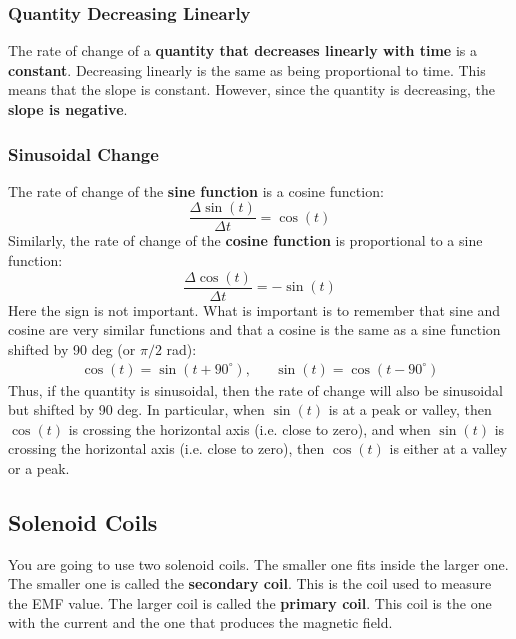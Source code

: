 \subsubsection{Quantity Decreasing Linearly}
The rate of change of a \textbf{quantity that decreases linearly with time} is a \textbf{constant}. Decreasing linearly is the same as being proportional to time. This means that the slope is constant. However, since the quantity is decreasing, the \textbf{slope is negative}.
\subsubsection{Sinusoidal Change}
The rate of change of the \textbf{sine function} is a cosine function:
\begin{equation}
	\frac{\Delta \sin(t)}{\Delta t} = \cos(t)
\end{equation}
Similarly, the rate of change of the \textbf{cosine function} is proportional to a sine function:
\begin{equation}
	\frac{\Delta \cos(t)}{\Delta t} = -\sin(t)
\end{equation}
Here the sign is not important. What is important is to remember that sine and cosine are very similar functions and that a cosine is the same as a sine function shifted by 90 deg (or $\pi/2$ rad):
\begin{align}
	\cos(t) = \sin(t + 90^{\circ}), && \sin(t) = \cos(t - 90^{\circ})
\end{align}
Thus, if the quantity is sinusoidal, then the rate of change will also be sinusoidal but shifted by 90 deg. In particular, when $\sin(t)$ is at a peak or valley, then $\cos(t)$ is crossing the horizontal axis (i.e. close to zero), and when $\sin(t)$ is crossing the horizontal axis (i.e. close to zero), then $\cos(t)$ is either at a valley or a peak.
\subsection{Solenoid Coils}
You are going to use two solenoid coils. The smaller one fits inside the larger one. The smaller one is called the \textbf{secondary coil}. This is the coil used to measure the EMF value. The larger coil is called the \textbf{primary coil}. This coil is the one with the current and the one that produces the magnetic field.

